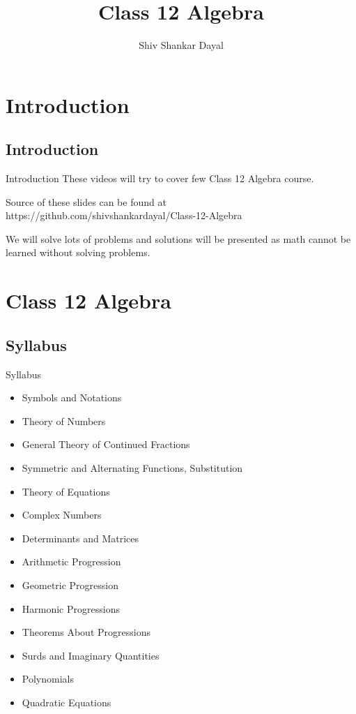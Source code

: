 \documentclass[aspectratio=169]{beamer}
\title{Class 12 Algebra}
\author[Shiv Shankar Dayal]
       {
	       Shiv Shankar Dayal
       }
\begin{document}
\begin{frame}
	\titlepage
\end{frame}

\begin{frame}
	\tableofcontents
\end{frame}

\section{Introduction}
\subsection{Introduction}

\begin{frame}{Introduction}
	These videos will try to cover few Class 12 Algebra course.

	Source of these slides can be found at
	https://github.com/shivshankardayal/Class-12-Algebra

	We will solve lots of problems and solutions will be
	presented as math cannot be learned without solving
	problems.
\end{frame}

\section{Class 12 Algebra}
\subsection{Syllabus}
\begin{frame}{Syllabus}
	\begin{itemize}
		\item Symbols and Notations
		\item Theory of Numbers
		\item General Theory of Continued Fractions
		\item Symmetric and Alternating Functions, Substitution
		\item Theory of Equations
		\item Complex Numbers
		\item Determinants and Matrices
		\item Arithmetic Progression
		\item Geometric Progression
		\item Harmonic Progressions
		\item Theorems About Progressions
		\item Surds and Imaginary Quantities
		\item Polynomials
		\item Quadratic Equations
	\end{itemize}
\end{frame}
\end{document}
